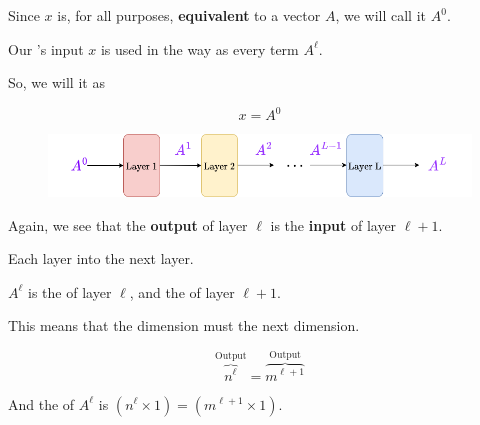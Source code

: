         Since $x$ is, for all purposes, \textbf{equivalent} to a vector $A$, we will call it $A^0$.\\
        
        \begin{notation}
            Our 's input $x$ is used in the  way as every term $A^\ell$.
            
            So, we will  it as 
            
            \begin{equation*}
                x = A^0
            \end{equation*}
        \end{notation}
        
        \begin{figure}[H]
            \centering
            \includegraphics[width=140mm,scale=0.4]{images/nn_images/all_layers.png}
        \end{figure}
        
        Again, we see that the \textbf{output} of layer $\ell$ is the \textbf{input} of layer $\ell+1$.\\
        
        \begin{concept}
            Each layer  into the next layer.
            
            $A^\ell$ is the  of layer $\ell$, and the  of layer $\ell+1$.
            
            This means that the  dimension must  the next  dimension.
            
            \begin{equation*}
                \overbrace{
                    n^\ell
                }^{\text{Output}}
                =
                \overbrace{
                    m^{\ell+1}
                }^{\text{Output}}
            \end{equation*}
            
            And the  of $A^\ell$ is $(n^\ell \times 1) = (m^{\ell+1} \times 1)$.
        \end{concept}
        
